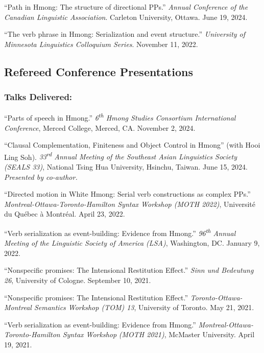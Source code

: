 \documentclass[11pt,oneside,DIV=8,parskip=off,letterpaper]{scrarticle} %
\newlength{\spacingbefore}
\newlength{\spacingafter}
\newcommand{\myonecol}[1]{%
	\vspace{\spacingbefore}%
	\begin{minipage}[t]{\linewidth}%
		\strut#1%
	\end{minipage}%
	\vspace{\spacingafter}\par%
	}
\newcommand{\talk}[1]{%
	\myonecol{#1}%
	}
\begin{document}
\talk{``Path in Hmong: The structure of directional PPs.'' \textit{Annual Conference of the Canadian Linguistic Association}. Carleton University, Ottawa. June 19, 2024.}

\talk{``The verb phrase in Hmong: Serialization and event structure.'' \textit{University of Minnesota Linguistics Colloquium Series}. November 11, 2022.}


\subsection{Refereed Conference Presentations}

\subsubsection{Talks Delivered:}
\talk{``Parts of speech in Hmong.'' \textit{6\textsuperscript{th} Hmong Studies Consortium International Conference}, Merced College, Merced, CA. November 2, 2024.}

\talk{``Clausal Complementation, Finiteness and Object Control in Hmong'' (with Hooi Ling Soh). \textit{33\textsuperscript{rd} Annual Meeting of the Southeast Asian Linguistics Society (SEALS 33)}, National Tsing Hua University, Hsinchu, Taiwan. June 15, 2024. \emph{Presented by co-author.}} 

\talk{``Directed motion in White Hmong: Serial verb constructions as complex PPs.'' \textit{Montreal-Ottawa-Toronto-Hamilton Syntax Workshop (MOTH 2022)}, Universit\'e du Qu\'ebec \`a Montr\'eal. April 23, 2022.}

\talk{``Verb serialization as event-building: Evidence from Hmong.'' \textit{96\textsuperscript{th} Annual Meeting of the Linguistic Society of America (LSA)}, Washington, DC. January 9, 2022.}

\talk{``Nonspecific promises: The Intensional Restitution Effect.'' \textit{Sinn und Bedeutung 26}, University of Cologne. September 10, 2021.}

\talk{``Nonspecific promises: The Intensional Restitution Effect.'' \textit{Toronto-Ottawa-Montreal Semantics Workshop (TOM) 13}, University of Toronto. May 21, 2021.}

\talk{``Verb serialization as event-building: Evidence from Hmong.'' \textit{Montreal-Ottawa-Toronto-Hamilton Syntax Workshop} \textit{(MOTH 2021)}, McMaster University. April 19, 2021.}
\end{document}
